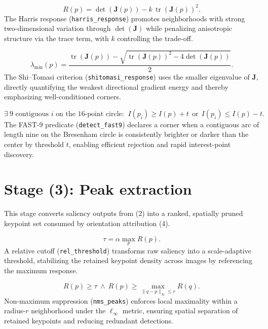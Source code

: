 \documentclass[11pt]{article}
\begin{document}
\begin{equation}
R(p)=\det(\mathbf{J}(p)) - k\,\operatorname{tr}(\mathbf{J}(p))^{2}.
\end{equation}
The Harris response (\texttt{harris\_response}) promotes neighborhoods with strong two-dimensional variation through $\det(\mathbf{J})$ while penalizing anisotropic structure via the trace term, with $k$ controlling the trade-off.

\begin{equation}
\lambda_{\min}(p)=\frac{\operatorname{tr}(\mathbf{J}(p))-\sqrt{\operatorname{tr}(\mathbf{J}(p))^{2}-4\det(\mathbf{J}(p))}}{2}.
\end{equation}
The Shi--Tomasi criterion (\texttt{shitomasi\_response}) uses the smaller eigenvalue of $\mathbf{J}$, directly quantifying the weakest directional gradient energy and thereby emphasizing well-conditioned corners.

\begin{equation}
\exists\ \text{9 contiguous } i \text{ on the 16-point circle: }\ I(p_{i})\ge I(p)+t\ \ \text{or}\ \ I(p_{i})\le I(p)-t .
\end{equation}
The FAST-9 predicate (\texttt{detect\_fast9}) declares a corner when a contiguous arc of length nine on the Bresenham circle is consistently brighter or darker than the center by threshold $t$, enabling efficient rejection and rapid interest-point discovery.

\section*{Stage (3): Peak extraction}
This stage converts saliency outputs from (2) into a ranked, spatially pruned keypoint set consumed by orientation attribution (4).

\begin{equation}
\tau=\alpha \max_{p} R(p).
\end{equation}
A relative cutoff (\texttt{rel\_threshold}) transforms raw saliency into a scale-adaptive threshold, stabilizing the retained keypoint density across images by referencing the maximum response.

\begin{equation}
R(p)\ge \tau\ \wedge\ R(p)\ge \max_{\lVert q-p\rVert_{\infty}\le r} R(q).
\end{equation}
Non-maximum suppression (\texttt{nms\_peaks}) enforces local maximality within a radius-$r$ neighborhood under the $\ell_{\infty}$ metric, ensuring spatial separation of retained keypoints and reducing redundant detections.
\end{document}
